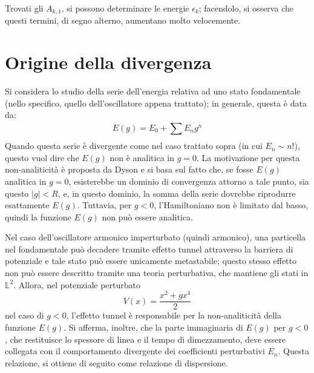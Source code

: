 \documentclass[10pt, a4paper]{scrartcl} %
\numberwithin{equation}{section}
\theoremstyle{style2}
\theoremstyle{style1}
\begin{document}
Trovati gli $A_{k,1} $, si possono determinare le energie $\epsilon _k$; facendolo, si osserva che questi termini, di segno alterno, aumentano molto velocemente.

\section{Origine della divergenza}
Si considera lo studio della serie dell'energia relativa ad uno stato fondamentale (nello specifico, quello dell'oscillatore appena trattato); in generale, questa \`e data da:
\begin{equation}
	E(g) = E_0 + \sum_{}^{} E_n g^n
\end{equation}
Quando questa serie \`e divergente come nel caso trattato sopra (in cui $E_n \sim n!$), questo vuol dire che $E(g)$ non \`e analitica in $g=0$.
La motivazione per questa non-analiticit\`a \`e proposta da Dyson e si basa sul fatto che, se fosse $E(g)$ analitica in $g=0$, esisterebbe un dominio di convergenza attorno a tale punto, sia questo $\lvert g \rvert < R$, e, in questo dominio, la somma della serie dovrebbe riprodurre esattamente $E(g)$.
Tuttavia, per $g<0$, l'Hamiltoniano non \`e limitato dal basso, quindi la funzione $E(g)$ non pu\`o essere analitica. 

Nel caso dell'oscillatore armonico imperturbato (quindi armonico), una particella nel fondamentale pu\`o decadere tramite effetto tunnel attraverso la barriera di potenziale e tale stato pu\`o essere unicamente metastabile; questo stesso effetto non pu\`o essere descritto tramite una teoria perturbativa, che mantiene gli stati in $\mathbb{L}^2$. 
Allora, nel potenziale perturbato
\[
V(x) = \frac{x^2 + gx^4 }{2}
\] 
nel caso di $g< 0$, l'effetto tunnel \`e responsabile per la non-analiticit\`a della funzione $E(g)$.
Si afferma, inoltre, che la parte immaginaria di $E(g)$ per $g<0$, che restituisce lo spessore di linea e il tempo di dimezzamento, deve essere collegata con il comportamento divergente dei coefficienti perturbativi $E_n$.
Questa relazione, si ottiene di seguito come relazione di dispersione.
\end{document}
